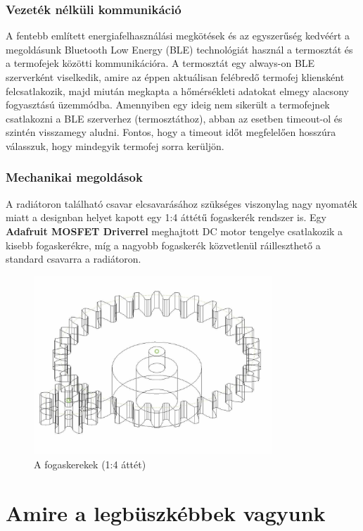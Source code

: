 \documentclass[12pt,a4paper]{article}
\begin{document}
\subsubsection{Vezeték nélküli kommunikáció}
A fentebb említett energiafelhasználási megkötések és az egyszerűség kedvéért a megoldásunk Bluetooth Low Energy (BLE) technológiát használ a termosztát és a termofejek közötti
kommunikációra. A termosztát egy always-on BLE szerverként viselkedik, amire az éppen aktuálisan felébredő termofej kliensként felcsatlakozik, majd miután megkapta a hőmérsékleti
adatokat elmegy alacsony fogyasztású üzemmódba. Amennyiben egy ideig nem sikerült a termofejnek csatlakozni a BLE szerverhez (termosztáthoz), abban az esetben timeout-ol és szintén
visszamegy aludni. Fontos, hogy a timeout időt megfelelően hosszúra válasszuk, hogy mindegyik termofej sorra kerüljön.

\subsubsection{Mechanikai megoldások}
A radiátoron található csavar elcsavarásához szükséges viszonylag nagy nyomaték miatt a designban helyet kapott egy 1:4 áttétű fogaskerék rendszer is.
Egy \textbf{Adafruit MOSFET Driverrel} meghajtott DC motor tengelye csatlakozik a kisebb fogaskerékre, míg a nagyobb fogaskerék közvetlenül ráilleszthető
a standard csavarra a radiátoron.

\begin{figure}[H]
    \centering
    \includegraphics[width=0.8\textwidth]{figures/fogaskerek.jpg}
    \caption{A fogaskerekek (1:4 áttét)}
    \label{fig:rirs}
\end{figure}

\newpage

\section{Amire a legbüszkébbek vagyunk}
\end{document}

